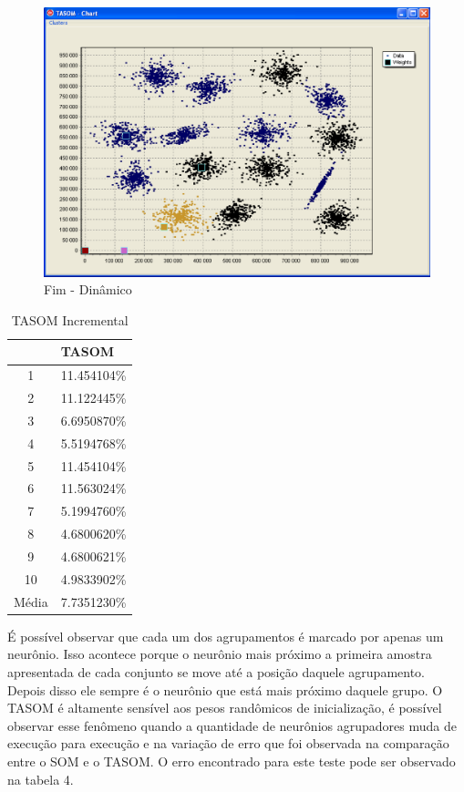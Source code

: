 \begin{figure}[!h]
\centering
\includegraphics[keepaspectratio=true,scale=0.5]
{figuras/tsom3.eps}
\caption{Fim - Dinâmico}
\label{data_titatic}
\end{figure}

\begin{table}[h]
\centering
\caption{TASOM Incremental}
\label{my-label}
\begin{tabular}{c|l|}
\cline{2-2}
                            & TASOM      \\ \hline
\multicolumn{1}{|c|}{1}     & 11.454104\%  \\ \hline
\multicolumn{1}{|c|}{2}     & 11.122445\%  \\ \hline
\multicolumn{1}{|c|}{3}     & 6.6950870\%  \\ \hline
\multicolumn{1}{|c|}{4}     & 5.5194768\%  \\ \hline
\multicolumn{1}{|c|}{5}     & 11.454104\%  \\ \hline
\multicolumn{1}{|c|}{6}     & 11.563024\% \\ \hline
\multicolumn{1}{|c|}{7}     & 5.1994760\%  \\ \hline
\multicolumn{1}{|c|}{8}     & 4.6800620\%  \\ \hline
\multicolumn{1}{|c|}{9}     & 4.6800621\%  \\ \hline
\multicolumn{1}{|c|}{10}    & 4.9833902\%   \\ \hline
\multicolumn{1}{|l|}{Média} & 7.7351230\% \\ \hline
\end{tabular}
\end{table} 

É possível observar que cada um dos agrupamentos é marcado por apenas um neurônio. Isso acontece porque o neurônio mais próximo a primeira amostra apresentada de cada conjunto se move até a posição daquele agrupamento. Depois disso ele sempre é o neurônio que está mais próximo daquele grupo. O TASOM é altamente sensível aos pesos randômicos de inicialização, é possível observar esse fenômeno quando a quantidade de neurônios agrupadores muda de execução para execução e na variação de erro que foi observada na comparação entre o SOM e o TASOM. O erro encontrado para este teste pode ser observado na tabela 4.

